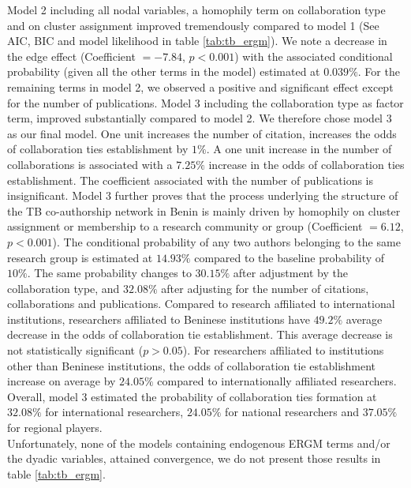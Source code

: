 Model 2 including all nodal variables, a homophily term on collaboration type and on cluster assignment improved tremendously compared to model 1 (See AIC, BIC and model likelihood in table \ref{tab:tb_ergm}). We note a decrease in the edge effect (Coefficient $=-7.84$, $p<0.001$) with the associated conditional probability (given all the other terms in the model) estimated at $0.039\%$. For the remaining terms in model 2, we observed a positive and significant effect except for the number of publications. Model 3 including the collaboration type as factor term, improved substantially compared to model 2. We therefore chose model 3 as our final model. One unit increases the number of citation, increases the odds of collaboration ties establishment by $1\%$. A one unit increase in the number of collaborations is associated with a $7.25\%$ increase in the odds of collaboration ties establishment. The coefficient associated with the number of publications is insignificant. Model 3 further proves that the process underlying the structure of the TB co-authorship network in Benin is mainly driven by homophily on cluster assignment or membership to a research community or group (Coefficient $=6.12$, $p<0.001$). The conditional probability of any two authors belonging to the same research group is estimated at $14.93\%$ compared to the baseline probability of $10\%$. The same probability changes to $30.15\%$ after adjustment by the collaboration type, and $32.08\%$ after adjusting for the number of citations, collaborations and publications. Compared to research affiliated to international institutions, researchers affiliated to Beninese institutions have $49.2\%$ average decrease in the odds of collaboration tie establishment. This average decrease is not statistically significant ($p>0.05$). For researchers affiliated to institutions other than Beninese institutions, the odds of collaboration tie establishment increase on average by $24.05\%$ compared to internationally affiliated researchers. Overall, model 3 estimated the probability of collaboration ties formation at $32.08\%$ for international researchers, $24.05\%$ for national researchers and $37.05\%$ for regional players. \\
Unfortunately, none of the models containing endogenous ERGM terms and/or the dyadic variables, attained convergence, we do not present those results in table \ref{tab:tb_ergm}.


